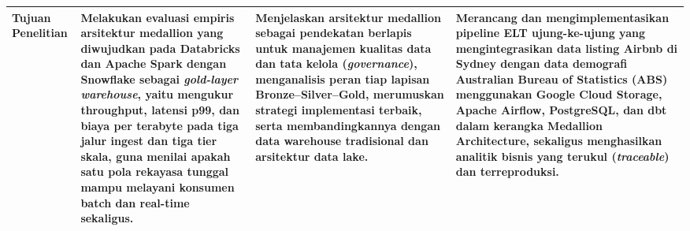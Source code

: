 \documentclass[11pt,a4paper]{article}
\begin{document}
\begin{longtable}{|L{2.5cm}|L{7.65cm}|L{7.65cm}|L{7.65cm}|}
\textbf{Tujuan Penelitian} &
Melakukan evaluasi empiris arsitektur medallion yang diwujudkan pada Databricks dan Apache Spark dengan Snowflake sebagai \textit{gold-layer warehouse}, yaitu mengukur throughput, latensi p99, dan biaya per terabyte pada tiga jalur ingest dan tiga tier skala, guna menilai apakah satu pola rekayasa tunggal mampu melayani konsumen batch dan real-time sekaligus. &
Menjelaskan arsitektur medallion sebagai pendekatan berlapis untuk manajemen kualitas data dan tata kelola (\textit{governance}), menganalisis peran tiap lapisan Bronze--Silver--Gold, merumuskan strategi implementasi terbaik, serta membandingkannya dengan data warehouse tradisional dan arsitektur data lake. &
Merancang dan mengimplementasikan pipeline ELT ujung-ke-ujung yang mengintegrasikan data listing Airbnb di Sydney dengan data demografi Australian Bureau of Statistics (ABS) menggunakan Google Cloud Storage, Apache Airflow, PostgreSQL, dan dbt dalam kerangka Medallion Architecture, sekaligus menghasilkan analitik bisnis yang terukul (\textit{traceable}) dan terreproduksi. \\
\hline


\end{longtable}
\end{document}
